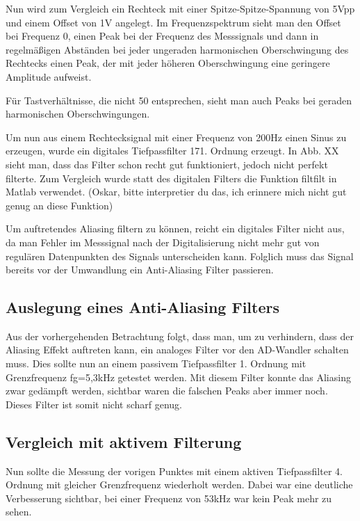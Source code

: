 Nun wird zum Vergleich ein Rechteck mit einer Spitze-Spitze-Spannung von 5Vpp und einem Offset von 1V angelegt. Im Frequenzspektrum sieht man den Offset bei Frequenz 0, einen Peak bei der Frequenz des Messsignals und dann in regelmäßigen Abständen bei jeder ungeraden harmonischen Oberschwingung des Rechtecks einen Peak, der mit jeder höheren Oberschwingung eine geringere Amplitude aufweist.

Für Tastverhältnisse, die nicht 50 entsprechen, sieht man auch Peaks bei geraden harmonischen Oberschwingungen.

Um nun aus einem Rechtecksignal mit einer Frequenz von 200Hz einen Sinus zu erzeugen, wurde ein digitales Tiefpassfilter 171. Ordnung erzeugt. In Abb. XX sieht man, dass das Filter schon recht gut funktioniert, jedoch nicht perfekt filterte. Zum Vergleich wurde statt des digitalen Filters die Funktion filtfilt in Matlab verwendet. (Oskar, bitte interpretier du das, ich erinnere mich nicht gut genug an diese Funktion)

Um auftretendes Aliasing filtern zu können, reicht ein digitales Filter nicht aus, da man Fehler im Messsignal nach der Digitalisierung nicht mehr gut von regulären Datenpunkten des Signals unterscheiden kann. Folglich muss das Signal bereits vor der Umwandlung ein Anti-Aliasing Filter passieren.

\subsection{Auslegung eines Anti-Aliasing Filters}

Aus der vorhergehenden Betrachtung folgt, dass man, um zu verhindern, dass der Aliasing Effekt auftreten kann, ein analoges Filter vor den AD-Wandler schalten muss. Dies sollte nun an einem passivem Tiefpassfilter 1. Ordnung mit Grenzfrequenz fg=5,3kHz getestet werden. Mit diesem Filter konnte das Aliasing zwar gedämpft werden, sichtbar waren die falschen Peaks aber immer noch. Dieses Filter ist somit nicht scharf genug.

\subsection{Vergleich mit aktivem Filterung}

Nun sollte die Messung der vorigen Punktes mit einem aktiven Tiefpassfilter 4. Ordnung mit gleicher Grenzfrequenz wiederholt werden. Dabei war eine deutliche Verbesserung sichtbar, bei einer Frequenz von 53kHz war kein Peak mehr zu sehen.

